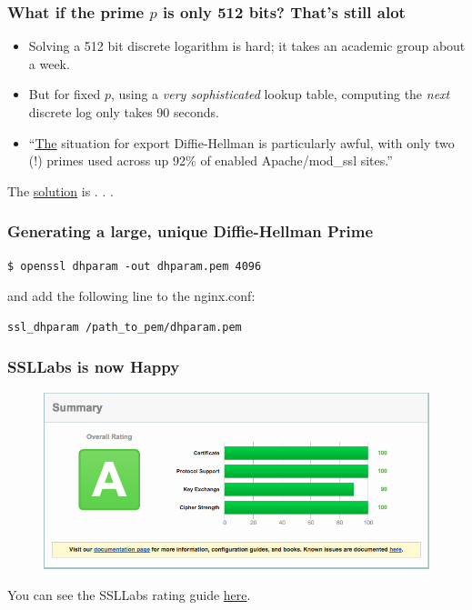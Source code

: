 \documentclass[9pt]{beamer}
\begin{document}
\begin{frame}[fragile]
\frametitle{What if the prime $p$ is only 512 bits? That's still alot}
\begin{itemize}
\item Solving a 512 bit discrete logarithm is hard; it takes an academic group about a week.

\item But for fixed $p$,  using a \emph{very sophisticated} lookup table, computing the \emph{next} discrete log only takes 90 seconds.

\item ``\href{http://blog.cryptographyengineering.com/2015/05/attack-of-week-logjam.html}{The} situation for export Diffie-Hellman is particularly awful, with only two (!) primes used across up 92\% of enabled Apache/mod\_ssl sites.''

\end{itemize}
The \href{https://weakdh.org/sysadmin.html}{solution} is . . .
\end{frame}

\begin{frame}[fragile]
\frametitle{Generating a large, unique Diffie-Hellman Prime}
\begin{verbatim}
$ openssl dhparam -out dhparam.pem 4096
\end{verbatim}
and add the following line to the nginx.conf:
\begin{verbatim}
ssl_dhparam /path_to_pem/dhparam.pem
\end{verbatim}
\end{frame}

\begin{frame}[fragile]
\frametitle{SSLLabs is now Happy}
\begin{figure}
\includegraphics[scale=0.25]{figures/SSLLabsA.png}
\end{figure}
You can see the SSLLabs rating guide \href{https://www.ssllabs.com/downloads/SSL_Server_Rating_Guide.pdf}{here}.
\end{frame}
\end{document}
